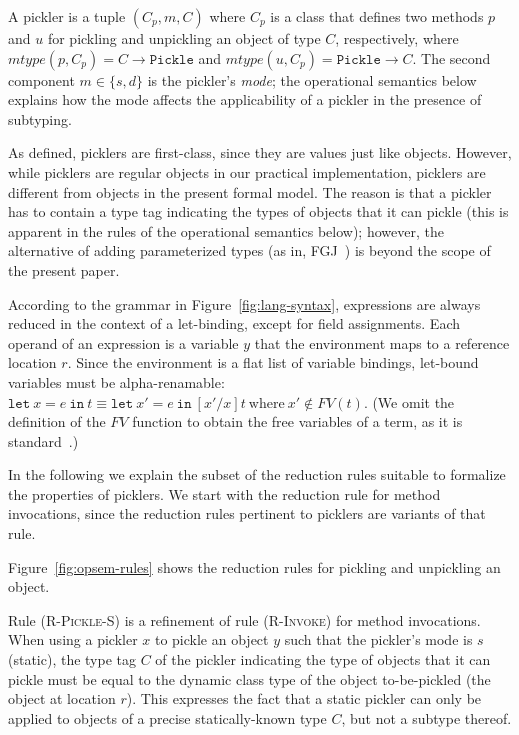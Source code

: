 A pickler is a tuple $(C_p, m, C)$ where $C_p$ is a class that defines two
methods $p$ and $u$ for pickling and unpickling an object of type $C$,
respectively, where $mtype(p, C_p) = C \rightarrow \texttt{Pickle}$ and
$mtype(u, C_p) = \texttt{Pickle} \rightarrow C$.
The second component $m \in \{s, d\}$ is the pickler's {\em
mode}; the operational semantics below explains how the mode affects the
applicability of a pickler in the presence of subtyping.

As defined, picklers are first-class, since they are values just like objects.
However, while picklers are regular objects in our practical implementation,
picklers are different from objects in the present formal model. The reason is
that a pickler has to contain a type tag indicating the types of objects that
it can pickle (this is apparent in the rules of the operational semantics
below); however, the alternative of adding parameterized types (as in, \eg
FGJ~\cite{Igarashi2001}) is beyond the scope of the present paper.

According to the grammar in Figure~\ref{fig:lang-syntax}, expressions are
always reduced in the context of a let-binding, except for field assignments.
Each operand of an expression is a variable $y$ that the environment maps to a
reference location $r$. Since the environment is a flat list of variable
bindings, let-bound variables must be alpha-renamable:
$\texttt{let}~x = e~\texttt{in}~t \equiv \texttt{let}~x' =
e~\texttt{in}~[x'/x]t~\text{where}~x' \notin FV(t)$. (We omit the
definition of the $FV$ function to obtain the free variables of a
term, as it is standard~\cite{TAPL}.)

In the following we explain the subset of the reduction rules suitable to
formalize the properties of picklers. We start with the reduction rule for
method invocations, since the reduction rules pertinent to picklers are
variants of that rule.

Figure~\ref{fig:opsem-rules} shows the reduction rules for pickling and
unpickling an object.

Rule \textsc{(R-Pickle-S)} is a refinement of rule \textsc{(R-Invoke)} for method invocations.
When using a pickler $x$ to pickle an object $y$ such that the pickler's mode
is $s$ (static), the type tag $C$ of the pickler indicating the type of
objects that it can pickle must be equal to the dynamic class type of the
object to-be-pickled (the object at location $r$). This expresses the fact
that a static pickler can only be applied to objects of a precise statically-known
type $C$, but not a subtype thereof.

